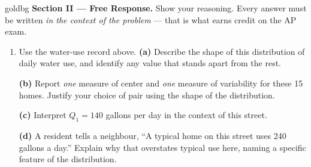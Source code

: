 \documentclass[12pt]{article}
\begin{document}
\boxguard[16]
\begin{headlinebox}{goldbg}
\small
\textbf{Section II --- Free Response.} Show your reasoning. Every answer must be written
\emph{in the context of the problem} --- that is what earns credit on the AP exam.
\end{headlinebox}

\vspace{0.10in}

\begin{enumerate}[leftmargin=1.9em, itemsep=0.12in, resume]

  \item Use the water-use record above. \textbf{(a)} Describe the shape of this distribution of
        daily water use, and identify any value that stands apart from the rest.\\[4pt]

        \boxguard[17]
        \vspace{4pt}
        \textbf{(b)} Report \emph{one} measure of center and \emph{one} measure of variability
        for these 15 homes. Justify your choice of pair using the shape of the distribution.\\[4pt]

        \boxguard[17]
        \vspace{4pt}
        \textbf{(c)} Interpret $Q_1 = 140$ gallons per day in the context of this street.\\[4pt]

        \boxguard[17]
        \vspace{4pt}
        \textbf{(d)} A resident tells a neighbour, ``A typical home on this street uses 240
        gallons a day.'' Explain why that overstates typical use here, naming a specific feature
        of the distribution.\\[4pt]

\end{enumerate}
\end{document}
